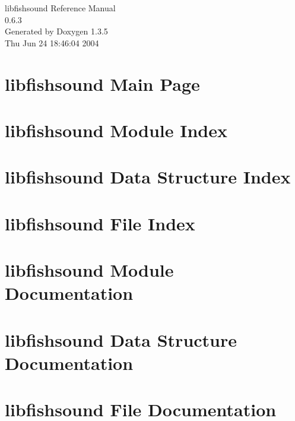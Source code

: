 \documentclass[a4paper]{book}
\begin{document}
\begin{titlepage}
\vspace*{7cm}
\begin{center}
{\Large libfishsound Reference Manual\\[1ex]\large 0.6.3 }\\
\vspace*{1cm}
{\large Generated by Doxygen 1.3.5}\\
\vspace*{0.5cm}
{\small Thu Jun 24 18:46:04 2004}\\
\end{center}
\end{titlepage}
\clearemptydoublepage
{}
\tableofcontents
\clearemptydoublepage
{}
\chapter{libfishsound Main Page}
\label{index}
\chapter{libfishsound Module Index}

\chapter{libfishsound Data Structure Index}

\chapter{libfishsound File Index}

\chapter{libfishsound Module Documentation}







\chapter{libfishsound Data Structure Documentation}



\chapter{libfishsound File Documentation}



\printindex
\end{document}
